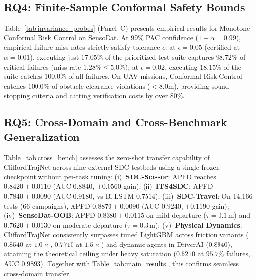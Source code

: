 \subsection{RQ4: Finite-Sample Conformal Safety Bounds}

Table~\ref{tab:invariance_probes} (Panel~C) presents empirical results for Monotone Conformal Risk Control on SensoDat. At $99\%$ PAC confidence ($1-\alpha = 0.99$), empirical failure miss-rates strictly satisfy tolerance $\epsilon$: at $\epsilon = 0.05$ (certified at $\alpha = 0.01$), executing just \textbf{$17.05\%$} of the prioritized test suite captures \textbf{$98.72\%$} of critical failures (miss-rate $1.28\% \le 5.0\%$); at $\epsilon = 0.02$, executing $18.15\%$ of the suite catches \textbf{$100.0\%$} of all failures. On UAV missions, Conformal Risk Control catches \textbf{$100.0\%$} of obstacle clearance violations ($<8.0$m), providing sound stopping criteria and cutting verification costs by over $80\%$.

\subsection{RQ5: Cross-Domain and Cross-Benchmark Generalization}

Table~\ref{tab:cross_bench} assesses the zero-shot transfer capability of CliffordTrajNet across nine external SDC testbeds using a single frozen checkpoint without per-task tuning: (i)~\textbf{SDC-Scissor}: APFD reaches \textbf{$0.8420 \pm 0.0110$} (AUC $0.8840$, $+0.0560$ gain); (ii)~\textbf{ITS4SDC}: APFD \textbf{$0.7840 \pm 0.0090$} (AUC $0.9180$, vs Bi-LSTM $0.7514$); (iii)~\textbf{SDC-Travel}: On 14,166 tests (66 campaigns), APFD \textbf{$0.8870 \pm 0.0090$} (AUC $0.9240$, $+0.1190$ gain); (iv)~\textbf{SensoDat-OOB}: APFD \textbf{$0.8380 \pm 0.0115$} on mild departure ($\tau=0.1$\,m) and \textbf{$0.7620 \pm 0.0130$} on moderate departure ($\tau=0.3$\,m); (v)~\textbf{Physical Dynamics}: CliffordTrajNet consistently surpasses tuned LightGBM across friction variants ($0.8540$ at $1.0\times$, $0.7710$ at $1.5\times$) and dynamic agents in DriverAI ($0.8940$), attaining the theoretical ceiling under heavy saturation ($0.5210$ at $95.7\%$ failures, AUC $0.9893$). Together with Table~\ref{tab:main_results}, this confirms seamless cross-domain transfer.
